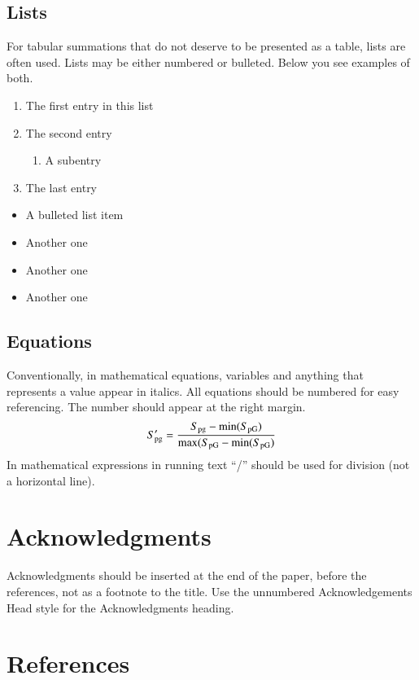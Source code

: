 \documentclass[times,onecolumn,final,longtitle]{elsarticle}
\begin{document}
\subsection{Lists}

For tabular summations that do not deserve to be presented as
a table, lists are often used. Lists may be either numbered or
bulleted. Below you see examples of both.
\begin{enumerate}
\item The first entry in this list
\item The second entry
\begin{enumerate}
\item A subentry
\end{enumerate}
\item The last entry
\end{enumerate}
\begin{itemize}
\item A bulleted list item
\item Another one
\item Another one
\item Another one
\end{itemize}

\subsection{Equations}
Conventionally, in mathematical equations, variables and
anything that represents a value appear in italics.
All equations should be numbered for easy referencing. The number
should appear at the right margin.
\begin{equation}
S_{\rm pg}'=\frac{S_{\rm pg}-\min(S_{\rm pG})}
 {\max(S_{\rm pG}-\min(S_{\rm pG})}
\end{equation}
In mathematical expressions in running text ``/'' should be used for
division (not a horizontal line).

\section*{Acknowledgments}
Acknowledgments should be inserted at the end of the paper, before the
references, not as a footnote to the title. Use the unnumbered
Acknowledgements Head style for the Acknowledgments heading.

\section*{References}
\end{document}
